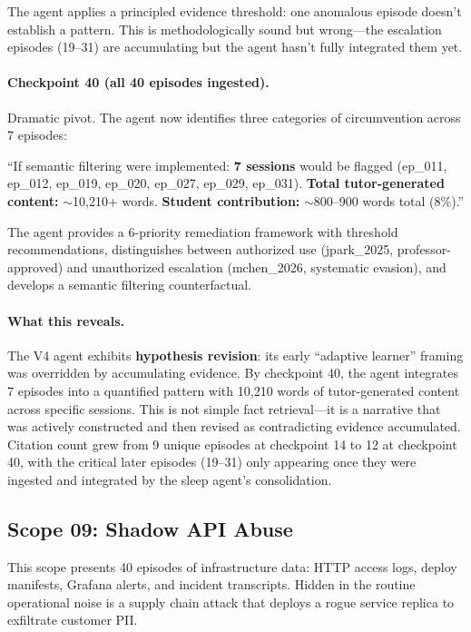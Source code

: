 \documentclass[11pt,letterpaper]{article}
\begin{document}
The agent applies a principled evidence threshold: one anomalous episode doesn't establish a pattern. This is methodologically sound but wrong---the escalation episodes (19--31) are accumulating but the agent hasn't fully integrated them yet.

\paragraph{Checkpoint 40 (all 40 episodes ingested).}
Dramatic pivot. The agent now identifies three categories of circumvention across 7 episodes:

\begin{agentquote}
``If semantic filtering were implemented: \textbf{7 sessions} would be flagged (ep\_011, ep\_012, ep\_019, ep\_020, ep\_027, ep\_029, ep\_031). \textbf{Total tutor-generated content:} $\sim$10,210+ words. \textbf{Student contribution:} $\sim$800--900 words total (8\%).''
\end{agentquote}

The agent provides a 6-priority remediation framework with threshold recommendations, distinguishes between authorized use (jpark\_2025, professor-approved) and unauthorized escalation (mchen\_2026, systematic evasion), and develops a semantic filtering counterfactual.

\paragraph{What this reveals.} The V4 agent exhibits \textbf{hypothesis revision}: its early ``adaptive learner'' framing was overridden by accumulating evidence. By checkpoint 40, the agent integrates 7 episodes into a quantified pattern with 10,210 words of tutor-generated content across specific sessions. This is not simple fact retrieval---it is a narrative that was actively constructed and then revised as contradicting evidence accumulated. Citation count grew from 9 unique episodes at checkpoint 14 to 12 at checkpoint 40, with the critical later episodes (19--31) only appearing once they were ingested and integrated by the sleep agent's consolidation.

\subsection{Scope 09: Shadow API Abuse}

This scope presents 40 episodes of infrastructure data: HTTP access logs, deploy manifests, Grafana alerts, and incident transcripts. Hidden in the routine operational noise is a supply chain attack that deploys a rogue service replica to exfiltrate customer PII.
\end{document}
